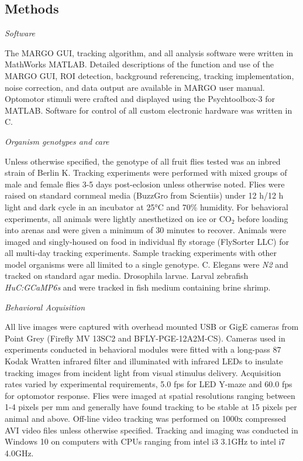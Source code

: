 \documentclass[10pt]{article}
\begin{document}
\begin{multicols}{2}
\section*{Methods}

\noindent\textit{Software}
\vspace*{0.3cm}

The MARGO GUI, tracking algorithm, and all analysis software were written in MathWorks MATLAB. Detailed descriptions of the function and use of the MARGO GUI, ROI detection, background referencing, tracking implementation, noise correction, and data output are available in MARGO user manual. Optomotor stimuli were crafted and displayed using the Psychtoolbox-3 for MATLAB. Software for control of all custom electronic hardware was written in C.

\vspace*{0.5cm}
\noindent\textit{Organism genotypes and care}
\vspace*{0.3cm}

Unless otherwise specified, the genotype of all fruit flies tested was an inbred strain of  Berlin K. Tracking experiments were performed with mixed groups of male and female flies 3-5 days post-eclosion unless otherwise noted.  Flies were raised on standard cornmeal media (BuzzGro from Scientiis) under 12 h/12 h light and dark cycle in an incubator at 25°C and 70\% humidity. For behavioral experiments, all animals were lightly anesthetized on ice or CO$_2$ before loading into arenas and were given a minimum of 30 minutes to recover. Animals were imaged and singly-housed on food in individual fly storage (FlySorter LLC) for all multi-day tracking experiments. Sample tracking experiments with other model organisms were all limited to a single genotype. C. Elegans were \textit{N2} and tracked on standard agar media. Drosophila larvae. Larval zebrafish \textit{HuC:GCaMP6s} and were tracked in fish medium containing brine shrimp.

\vspace*{0.5cm}
\noindent\textit{Behavioral Acquisition}
\vspace*{0.3cm}

All live images were captured with overhead mounted USB or GigE cameras from Point Grey (Firefly MV 13SC2 and BFLY-PGE-12A2M-CS). Cameras used in experiments conducted in behavioral modules were fitted with a long-pass 87 Kodak Wratten infrared filter and illuminated with infrared LEDs to insulate tracking images from incident light from visual stimulus delivery. Acquisition rates varied by experimental requirements, 5.0 fps for LED Y-maze and 60.0 fps for optomotor response. Flies were imaged at spatial resolutions ranging between 1-4 pixels per mm and generally have found tracking to be stable at 15 pixels per animal and above.  Off-line video tracking was performed on 1000x compressed AVI video files unless otherwise specified. Tracking and imaging was conducted in Windows 10 on computers with CPUs ranging from intel i3 3.1GHz to intel i7 4.0GHz. 


\end{multicols}
\end{document}
